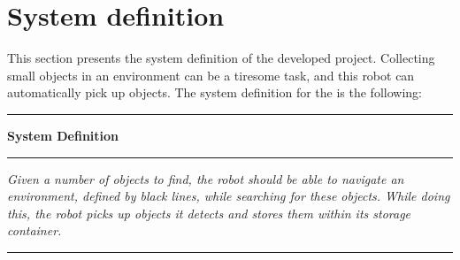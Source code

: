 \section{System definition} \label{sec:system_definition}
This section presents the system definition of the developed project. Collecting small objects in an environment can be a tiresome task, and this robot can automatically pick up objects. The system definition for the \projname{} is the following:

\begin{table}[H]
	\centering
	\begin{narrow}{1cm}{1cm}

	\rule{\linewidth}{0.035cm}
	\begin{center}
	\textbf{System Definition} 
	\end{center}
	\rule{\linewidth}{0.035cm}
    
	\medskip\noindent \textit{Given a number of objects to find, the robot should be able to navigate an environment, defined by black lines, while searching for these objects. While doing this, the robot picks up objects it detects and stores them within its storage container.}

	\rule{\linewidth}{0.035cm}
    \label{sec:systemdefinition}
	\end{narrow}
\end{table}

